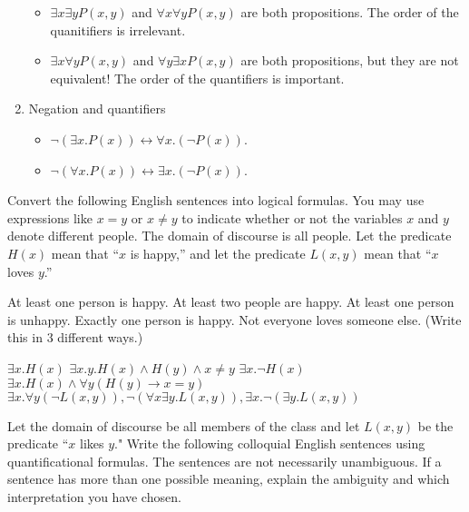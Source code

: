 \documentclass[solution, letterpaper]{cs20inclass}
\begin{document}
\begin{enumerate}
\begin{itemize}
\item $\exists x \exists y P(x,y)$ and $\forall x \forall y P(x,y)$ are both propositions. The order of the quanitifiers is irrelevant.

\item $\exists x \forall y P(x,y)$ and $\forall y \exists x P(x,y)$ are both propositions, but they are not equivalent! The order of the quantifiers is important. 

\end{itemize}

\item Negation and quantifiers
\begin{itemize}
\item $\neg (\exists x. P(x)) \leftrightarrow \forall x. (\neg P(x))$.
\item $\neg (\forall x. P(x)) \leftrightarrow \exists x. (\neg P(x))$.

\end{itemize}


\pagebreak
\end{enumerate}

\problem Convert the following English sentences into logical formulas. You may use expressions like $x=y$ or $x\neq y$ to indicate whether or not the variables $x$ and $y$ denote different people. The domain of discourse is all people. Let the predicate $H(x)$ mean that ``$x$ is happy,'' and let the predicate $L(x,y)$ mean that ``$x$ loves $y$.''

\subproblem At least one person is happy.
\subproblem At least two people are happy.
\subproblem At least one person is unhappy.
\subproblem Exactly one person is happy.
\subproblem Not everyone loves someone else. (Write this in 3 different ways.)

\begin{solution}
\subsolution $\exists x. H(x)$
\subsolution $\exists x.y.H(x) \wedge H(y) \wedge x \neq y$
\subsolution $\exists x. \lnot H(x)$
\subsolution $\exists x. H(x) \wedge \forall y (H(y) \rightarrow x = y)$
\subsolution $\exists x. \forall y(\lnot L(x,y)), \lnot(\forall x \exists y. L(x,y)), \exists x . \lnot (\exists y . L(x,y))$

\end{solution}

\problem Let the domain of discourse be all members of the class and let $L(x,y)$ be the predicate ``$x$ likes $y$." Write the following colloquial English sentences using quantificational formulas. The sentences are not necessarily unambiguous. If a sentence has more than one possible meaning, explain the ambiguity and which interpretation you have chosen.
\end{document}
